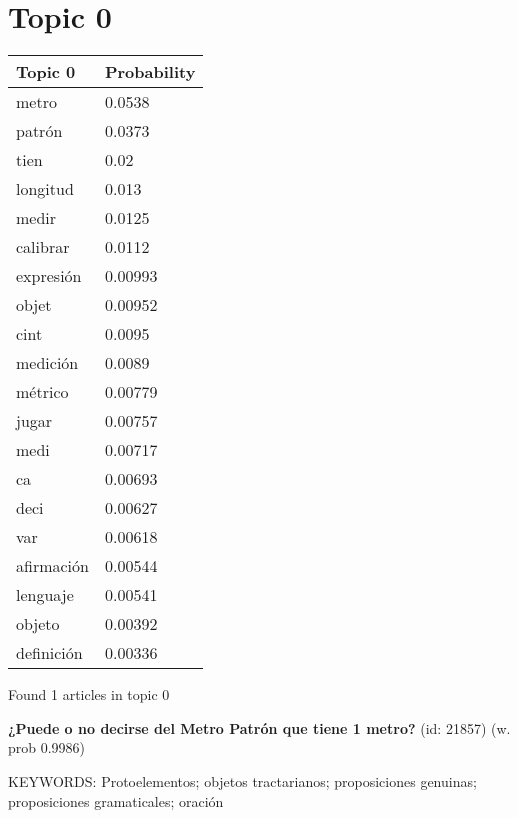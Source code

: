\documentclass{article}
\begin{document}
\section*{Topic 0}\vfill
\begin{tabular}{ll}
\toprule
    Topic 0 & Probability \\
\midrule
      metro &      0.0538 \\
     patrón &      0.0373 \\
       tien &        0.02 \\
   longitud &       0.013 \\
      medir &      0.0125 \\
   calibrar &      0.0112 \\
  expresión &     0.00993 \\
      objet &     0.00952 \\
       cint &      0.0095 \\
   medición &      0.0089 \\
    métrico &     0.00779 \\
      jugar &     0.00757 \\
       medi &     0.00717 \\
         ca &     0.00693 \\
       deci &     0.00627 \\
        var &     0.00618 \\
 afirmación &     0.00544 \\
   lenguaje &     0.00541 \\
     objeto &     0.00392 \\
 definición &     0.00336 \\
\bottomrule
\end{tabular}

\vfill
Found 1 articles in topic 0
\vfill

\textbf{¿Puede o no decirse del Metro Patrón que tiene 1 metro?} (id: 21857)
 (w. prob 0.9986)


KEYWORDS:
Protoelementos; objetos tractarianos; proposiciones genuinas; proposiciones gramaticales; oración

\vfill
\newpage


\centering
\thispagestyle{empty}
\end{document}
